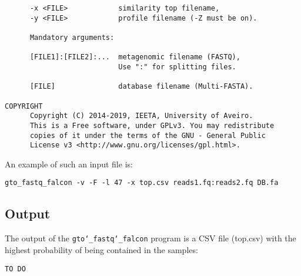 \begin{lstlisting}
      -x <FILE>            similarity top filename,                      
      -y <FILE>            profile filename (-Z must be on).             
                                                                         
      Mandatory arguments:                                               
                                                                         
      [FILE1]:[FILE2]:...  metagenomic filename (FASTQ),                 
                           Use ":" for splitting files.                
                                                                         
      [FILE]               database filename (Multi-FASTA).              
                                                                         
COPYRIGHT                                                                
      Copyright (C) 2014-2019, IEETA, University of Aveiro.              
      This is a Free software, under GPLv3. You may redistribute         
      copies of it under the terms of the GNU - General Public           
      License v3 <http://www.gnu.org/licenses/gpl.html>.    
\end{lstlisting}
An example of such an input file is:
\begin{lstlisting}
gto_fastq_falcon -v -F -l 47 -x top.csv reads1.fq:reads2.fq DB.fa 
\end{lstlisting}

\subsection*{Output}
The output of the \texttt{gto\char`_fastq\char`_falcon} program is a CSV file (top.csv) with the highest probability of being contained in the samples:
\begin{lstlisting}
TO DO
\end{lstlisting}
